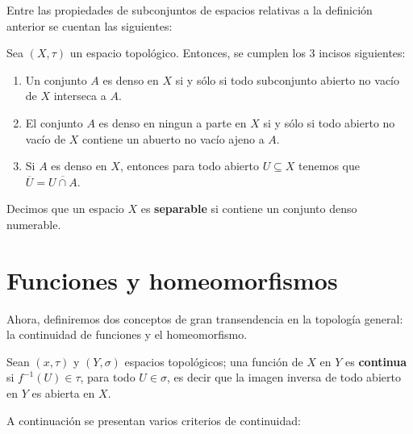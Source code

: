 \documentclass[12pt]{report}
\theoremstyle{largebreak}
\begin{document}
    Entre las propiedades de subconjuntos de espacios relativas a la definición anterior se cuentan las siguientes:

    \begin{propo}
        Sea $(X,\tau)$ un espacio topológico. Entonces, se cumplen los 3 incisos siguientes:
        \begin{enumerate}
            \item Un conjunto $A$ es denso en $X$ si y sólo si todo subconjunto abierto no vacío de $X$ interseca a $A$.
            \item El conjunto $A$ es denso en ningun a parte en $X$ si y sólo si todo abierto no vacío de $X$ contiene un abuerto no vacío ajeno a $A$.
            \item Si $A$ es denso en $X$, entonces para todo abierto $U\subseteq X$ tenemos que $\overline{U}=\overline{U\cap A}$.
        \end{enumerate}
    \end{propo}

    \begin{mydef}
        Decimos que un espacio $X$ es \textbf{separable} si contiene un conjunto denso numerable.
    \end{mydef}

    \section{Funciones y homeomorfismos}

    Ahora, definiremos dos conceptos de gran transendencia en la topología general: la continuidad de funciones y el homeomorfismo.

    \begin{mydef}
        Sean $(x,\tau)$ y $(Y,\sigma)$ espacios topológicos; una función de $X$ en $Y$ es \textbf{continua} si $f^{-1}(U)\in\tau$, para todo $U\in\sigma$, es decir que la imagen inversa de todo abierto en $Y$ es abierta en $X$.
    \end{mydef}

    A continuación se presentan varios criterios de continuidad:
\end{document}
